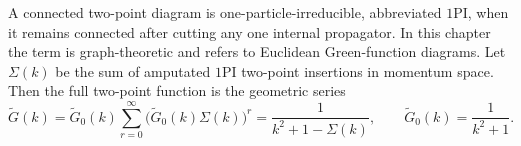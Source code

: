 A connected two-point diagram is one-particle-irreducible, abbreviated
\(1\mathrm{PI}\), when it remains connected after cutting any one internal
propagator. In this chapter the term is graph-theoretic and refers to
Euclidean Green-function diagrams. Let \(\Sigma(k)\) be the sum of amputated
\(1\mathrm{PI}\) two-point insertions in momentum space. Then the full
two-point function is the geometric series
\[
  \widetilde G(k)
  =
  \widetilde G_0(k)
  \sum_{r=0}^{\infty}
  \bigl(\widetilde G_0(k)\Sigma(k)\bigr)^r
  =
  \frac{1}{k^2+1-\Sigma(k)},
  \qquad
  \widetilde G_0(k)=\frac{1}{k^2+1}.
\]

\begin{center}
\end{center}

